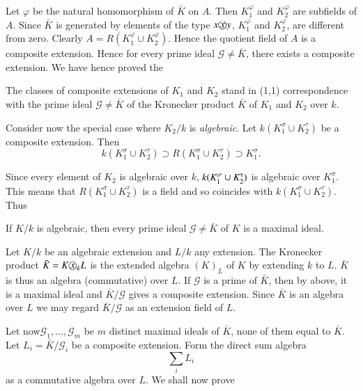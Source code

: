 Let $\varphi$ be the natural homomorphism of $\bar{K}$ on $A$. Then
$K^{\varphi}_1$ and $K^{\varphi}_2$ are subfields of $A$. Since
$\bar{K}$ is generated by elements of the type $x  \text{\textcircled{$x$}}  y$,
$K_1^{\varphi}$ and $K^{\varphi}_2$, are different from zero. Clearly
$A = R (K^{\varphi}_1  \cup  K^\varphi_2)$. Hence the quotient field
of $A$ is a composite extension. Hence for every prime ideal
$\mathscr{G} \neq \bar{K}$, there exists a composite extension. We
have hence proved the  

\begin{thm}\label{c5:thm4}%
The classes of composite extensions of $K_1$ and $K_2$ stand in (1,1)
  correspondence with the prime ideal $\mathscr{G} \neq \bar{K}$ of
  the Kronecker product $\bar{K}$ of $K_1$ and $K_2$ over $k$.  
\end{thm}

Consider now the special case where $K_2/k$ is \textit{algebraic}. Let
$k(K^{\sigma}_1  \cup  K^{\tau}_2)$ be a composite extension. Then  
$$
k(K^\sigma_1  \cup  K^\tau_2) \supset  R (K^\sigma_1  \cup
K^\tau_2) \supset  K^\sigma_1. 
$$

Since every element of $K_2$ is algebraic over $k$, $k(K^\sigma_1  \cup
K^\tauup_2)$ is algebraic over $K^\sigma_1$. This means that
$R(K^\sigma_1  \cup  K^\tau_2)$ is a field and so coincides with
$k(K^\sigma_1  \cup  K^\tau_2)$. Thus 

\begin{thm}\label{c5:thm5}%
If $K/k$ is algebraic, then every prime ideal $\mathscr{G} \neq
  \bar{K}$ of $K$ is a maximal ideal. 
\end{thm}

Let $K/k$ be an algebraic extension and $L/k$ any extension. The
Kronecker product $\bar{K} = K  \text{\textcircled{$x$}}_k  L$ is the extended
algebra $(K)_L$ of $K$ by extending $k$ to $L$. $\bar{K}$ is  thus an
algebra (commutative) over $L$. If $\mathscr{G}$ is a prime of
$\bar{K}$, then by above, it is a maximal ideal and
$\bar{K}/\mathscr{G}$ gives a composite extension. Since $\bar{K}$ is
an algebra over $L$ we may regard $\bar{K}/\mathscr{G}$ as an
extension field of $L$. 

Let now\pageoriginale $\mathscr{G}_1, \ldots, \mathscr{G}_m$ be $m$
distinct maximal ideals of $\bar{K}$, none of them equal to
$\bar{K}$. Let $L_i = \bar{K}/\mathscr{G}_i$ be a composite
extension. Form the direct sum algebra  
$$
\sum_i  L_i
$$
as a commutative algebra over $L$. We shall now prove 

